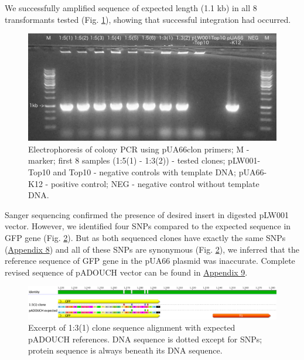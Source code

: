 We successfully amplified sequence of expected length (1.1 kb) in all 8 transformants tested (Fig. \ref{colonyPCR}), showing that successful integration had occurred.
\begin{figure}[ht!]
  \centering
  \includegraphics[scale=0.2]{text/Pictures/ColonyPCR.jpg}
	\caption{Electrophoresis of colony PCR using pUA66\textunderscore clon primers; M - marker; first 8 samples (1:5(1) - 1:3(2)) - tested clones; pLW001-Top10 and Top10 - negative controls with template DNA; pUA66-K12 - positive control; NEG - negative control without template DNA.}
	\label{colonyPCR}
\end{figure}
Sanger sequencing confirmed the presence of desired insert in digested pLW001 vector.
However, we identified four SNPs compared to the expected sequence in GFP gene (Fig. \ref{1:3(1)seq}).
But as both sequenced clones have exactly the same SNPs (\hyperlink{pADOUCHseq}{Appendix 8}) and all of these SNPs are synonymous (Fig. \ref{1:3(1)seq}), we inferred that the reference sequence of GFP gene in the pUA66 plasmid was inaccurate.
Complete revised sequence of pADOUCH vector can be found in \hyperlink{pADOUCHwhole}{Appendix 9}.
\begin{figure}[ht!]
  \centering
  \includegraphics[scale=0.26]{text/Pictures/pADOUCHseq.png}
	\caption{Excerpt of 1:3(1) clone sequence alignment with expected pADOUCH references. DNA sequence is dotted except for SNPs; protein sequence is always beneath its DNA sequence.}
	\label{1:3(1)seq}
\end{figure}

\cleardoublepage%

\shorthandon{-} 


